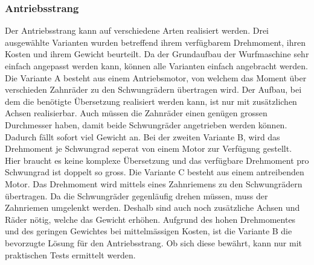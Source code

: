 \subsubsection{Antriebsstrang}
Der Antriebsstrang kann auf verschiedene Arten realisiert werden. Drei ausgewählte Varianten wurden
betreffend ihrem verfügbarem Drehmoment, ihren Kosten und ihrem Gewicht beurteilt. Da der Grundaufbau
der Wurfmaschine sehr einfach angepasst werden kann, können alle Varianten einfach angebracht werden.
Die Variante A besteht aus einem Antriebsmotor, von welchem das Moment über verschieden Zahnräder zu den
Schwungrädern übertragen wird. Der Aufbau, bei dem die benötigte Übersetzung realisiert werden kann, ist
nur mit zusätzlichen Achsen realisierbar. Auch müssen die Zahnräder einen genügen grossen Durchmesser
haben, damit beide Schwungräder angetrieben werden können. Dadurch fällt sofort viel Gewicht an. Bei der
zweiten Variante B, wird das Drehmoment je Schwungrad seperat von einem Motor zur Verfügung gestellt.
Hier braucht es keine komplexe Übersetzung und das verfügbare Drehmoment pro Schwungrad ist doppelt
so gross. Die Variante C besteht aus einem antreibenden Motor. Das Drehmoment wird mittels eines
Zahnriemens zu den Schwungrädern übertragen. Da die Schwungräder gegenläufig drehen müssen, muss der
Zahnriemen umgelenkt werden. Deshalb sind auch noch zusätzliche Achsen und Räder nötig, welche das
Gewicht erhöhen. Aufgrund des hohen Drehmomentes und des geringen Gewichtes bei mittelmässigen Kosten,
ist die Variante B die bevorzugte Lösung für den Antriebsstrang. Ob sich diese bewährt, kann nur mit
praktischen Tests ermittelt werden.
